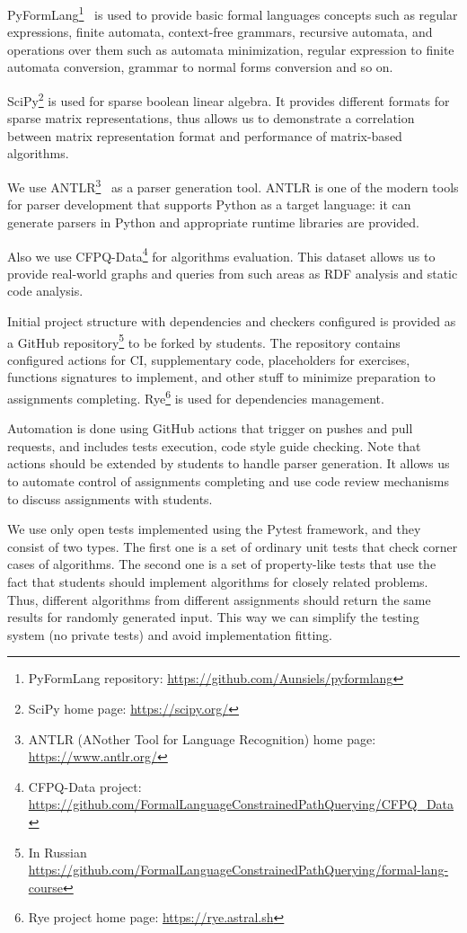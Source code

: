 \documentclass[sigconf]{acmart}
\begin{document}
PyFormLang\footnote{PyFormLang repository: \url{https://github.com/Aunsiels/pyformlang}}~\cite{10.1145/3408877.3432464} is used to provide basic formal languages concepts such as regular expressions, finite automata, context-free grammars, recursive automata, and operations over them such as automata minimization, regular expression to finite automata conversion, grammar to normal forms conversion and so on. 

SciPy\footnote{SciPy home page: \url{https://scipy.org/}} is used for sparse boolean linear algebra.
It provides different formats for sparse matrix representations, thus allows us to demonstrate a correlation between matrix representation format and performance of matrix-based algorithms. 

We use ANTLR\footnote{ANTLR (ANother Tool for Language Recognition) home page: \url{https://www.antlr.org/}}~\cite{10.5555/2501720} as a parser generation tool.
ANTLR is one of the modern tools for parser development that supports Python as a target language: it can generate parsers in Python and appropriate runtime libraries are provided.

Also we use CFPQ-Data\footnote{CFPQ-Data project: \url{https://github.com/FormalLanguageConstrainedPathQuerying/CFPQ_Data}} for algorithms evaluation.
This dataset allows us to provide real-world graphs and queries from such areas as RDF analysis and static code analysis. 

Initial project structure with dependencies and checkers configured is provided as a GitHub repository\footnote{In Russian \url{https://github.com/FormalLanguageConstrainedPathQuerying/formal-lang-course}} to be forked by students.
The repository contains configured actions for CI, supplementary code, placeholders for exercises, functions signatures to implement, and other stuff to minimize preparation to assignments completing.
Rye\footnote{Rye project home page: \url{https://rye.astral.sh}} is used for dependencies management.

Automation is done using GitHub actions that trigger on pushes and pull requests, and includes tests execution, code style guide checking.
Note that actions should be extended by students to handle parser generation.
It allows us to automate control of assignments completing and use code review mechanisms to discuss assignments with students.

We use only open tests implemented using the Pytest framework, and they consist of two types.
The first one is a set of ordinary unit tests that check corner cases of algorithms.
The second one is a set of property-like tests that use the fact that students should implement algorithms for closely related problems.
Thus, different algorithms from different assignments should return the same results for randomly generated input.
This way we can simplify the testing system (no private tests) and avoid implementation fitting. 
\end{document}

